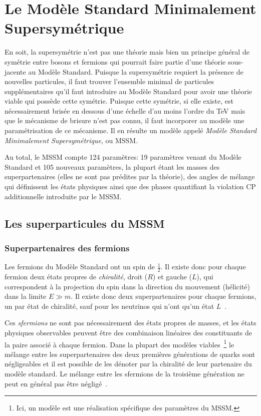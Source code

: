 \section{Le Modèle Standard Minimalement Supersymétrique}
\label{sec:susy:mssm}

En soit, la supersymétrie n'est pas une théorie mais bien un principe
général de symétrie entre bosons et fermions qui pourrait faire partie
d'une théorie sous-jacente au Modèle Standard. Puisque la
supersymétrie requiert la présence de nouvelles particules, il faut
trouver l'ensemble minimal de particules supplémentaires qu'il faut
introduire au Modèle Standard pour avoir une théorie viable qui
possède cette symétrie. Puisque cette symétrie, si elle existe, est
nécessairement brisée en dessous d'une échelle d'au moins l'ordre du
TeV mais que le mécanisme de brisure n'est pas connu, il faut
incorporer au modèle une paramétrisation de ce mécanisme. Il en
résulte un modèle appelé \emph{Modèle Standard Minimalement
  Supersymétrique}, ou MSSM.

Au total, le MSSM compte 124 paramètres: 19 paramètres venant du
Modèle Standard et 105 nouveaux paramètres, la plupart étant les
masses des superpartenaires (elles ne sont pas prédites par la
théorie), des angles de mélange qui définissent les états physiques
ainsi que des phases quantifiant la violation CP additionnelle
introduite par le MSSM.

\subsection{Les superparticules du MSSM}
\label{sec:susy:mssm:sparticules}

\subsubsection{Superpartenaires des fermions}

Les fermions du Modèle Standard ont un spin de $\frac{1}{2}$. Il
existe donc pour chaque fermion deux états propres de
\emph{chiralité}, droit ($R$) et gauche ($L$), qui correspondent à la
projection du spin dans la direction du mouvement (hélicité) dans la limite
$E \gg m$. Il existe donc deux superpartenaires pour chaque
fermions, un par état de chiralité, sauf pour les neutrinos qui n'ont
qu'un état $L$~\cite{thomson_modern_2013}.

Ces \emph{sfermions} ne sont pas nécessairement des états propres de
masses, et les états physiques observables peuvent être des
combinaison linéaires des constituants de la paire associé à chaque
fermion. Dans la plupart des modèles viables~\footnote{Ici, un modèle est une r\'ealisation sp\'ecifique des param\`etres du MSSM.} le mélange entre les
superpartenaires des deux premières générations de quarks sont
négligeables et il est possible de les dénoter par la chiralité de leur
partenaire du modèle standard. Le mélange entre les sfermions de la
troisième génération ne peut en général pas être
négligé~\cite{aad_summary_2015}. 

